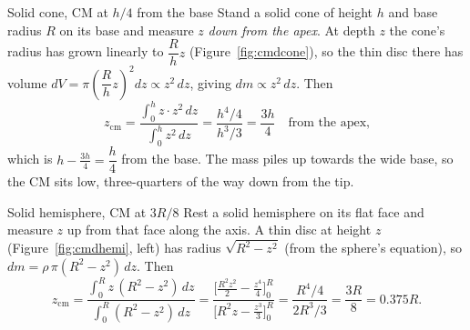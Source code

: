 \begin{derivbox}{Solid cone, CM at $h/4$ from the base}
Stand a solid cone of height $h$ and base radius $R$ on its base and measure $z$ \emph{down from the apex}. At depth $z$ the
cone's radius has grown linearly to $\dfrac{R}{h}z$ (Figure~\ref{fig:cmdcone}), so the thin disc there has volume
$dV=\pi\left(\dfrac{R}{h}z\right)^2 dz\propto z^2\,dz$, giving $dm\propto z^2\,dz$. Then
\[
z_{\text{cm}}=\frac{\int_0^h z\cdot z^2\,dz}{\int_0^h z^2\,dz}=\frac{h^4/4}{h^3/3}=\frac{3h}{4}
\quad\text{from the apex,}
\]
which is $h-\tfrac{3h}{4}=\dfrac{h}{4}$ from the base. The mass piles up towards the wide base, so the CM
sits low, three-quarters of the way down from the tip.
\end{derivbox}

\begin{figure}[htbp]
\centering
{}
\end{figure}

\begin{derivbox}{Solid hemisphere, CM at $3R/8$}
Rest a solid hemisphere on its flat face and measure $z$ up from that face along the axis. A thin disc at
height $z$ (Figure~\ref{fig:cmdhemi}, left) has radius $\sqrt{R^2-z^2}$ (from the sphere's equation), so
$dm=\rho\,\pi(R^2-z^2)\,dz$. Then
\[
z_{\text{cm}}=\frac{\int_0^R z\,(R^2-z^2)\,dz}{\int_0^R (R^2-z^2)\,dz}
=\frac{\big[\tfrac{R^2z^2}{2}-\tfrac{z^4}{4}\big]_0^R}{\big[R^2z-\tfrac{z^3}{3}\big]_0^R}
=\frac{R^4/4}{2R^3/3}=\frac{3R}{8}=0.375R.
\]
\end{derivbox}

\begin{figure}[htbp]
\centering
{}
\end{figure}


